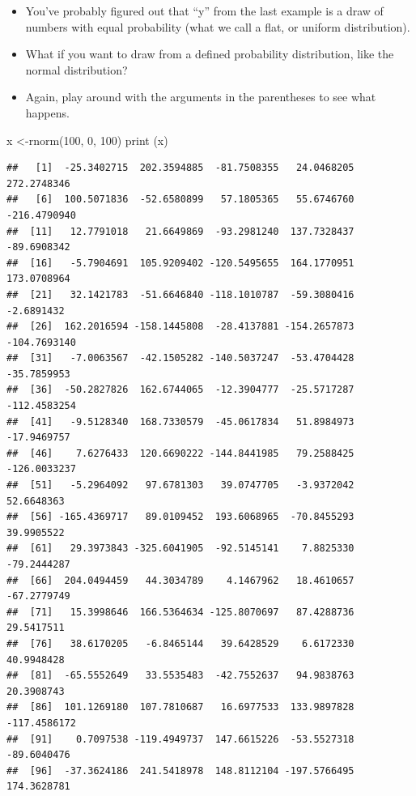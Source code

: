 \documentclass[
]{book}
\newenvironment{Shaded}{\begin{snugshade}}{\end{snugshade}}
\newcommand{\DecValTok}[1]{\textcolor[rgb]{0.00,0.00,0.81}{#1}}
\newcommand{\FunctionTok}[1]{\textcolor[rgb]{0.00,0.00,0.00}{#1}}
\newcommand{\NormalTok}[1]{#1}
\newcommand{\OtherTok}[1]{\textcolor[rgb]{0.56,0.35,0.01}{#1}}
\begin{document}
\begin{itemize}
\item
  You've probably figured out that ``y'' from the last example is a draw of numbers with equal probability (what we call a flat, or uniform distribution).
\item
  What if you want to draw from a defined probability distribution, like the normal distribution?
\item
  Again, play around with the arguments in the parentheses to see what happens.
\end{itemize}

\begin{Shaded}
\begin{Highlighting}[]
\NormalTok{x }\OtherTok{\textless{}{-}}\FunctionTok{rnorm}\NormalTok{(}\DecValTok{100}\NormalTok{, }\DecValTok{0}\NormalTok{, }\DecValTok{100}\NormalTok{)}
\FunctionTok{print}\NormalTok{ (x)}
\end{Highlighting}
\end{Shaded}

\begin{verbatim}
##   [1]  -25.3402715  202.3594885  -81.7508355   24.0468205  272.2748346
##   [6]  100.5071836  -52.6580899   57.1805365   55.6746760 -216.4790940
##  [11]   12.7791018   21.6649869  -93.2981240  137.7328437  -89.6908342
##  [16]   -5.7904691  105.9209402 -120.5495655  164.1770951  173.0708964
##  [21]   32.1421783  -51.6646840 -118.1010787  -59.3080416   -2.6891432
##  [26]  162.2016594 -158.1445808  -28.4137881 -154.2657873 -104.7693140
##  [31]   -7.0063567  -42.1505282 -140.5037247  -53.4704428  -35.7859953
##  [36]  -50.2827826  162.6744065  -12.3904777  -25.5717287 -112.4583254
##  [41]   -9.5128340  168.7330579  -45.0617834   51.8984973  -17.9469757
##  [46]    7.6276433  120.6690222 -144.8441985   79.2588425 -126.0033237
##  [51]   -5.2964092   97.6781303   39.0747705   -3.9372042   52.6648363
##  [56] -165.4369717   89.0109452  193.6068965  -70.8455293   39.9905522
##  [61]   29.3973843 -325.6041905  -92.5145141    7.8825330  -79.2444287
##  [66]  204.0494459   44.3034789    4.1467962   18.4610657  -67.2779749
##  [71]   15.3998646  166.5364634 -125.8070697   87.4288736   29.5417511
##  [76]   38.6170205   -6.8465144   39.6428529    6.6172330   40.9948428
##  [81]  -65.5552649   33.5535483  -42.7552637   94.9838763   20.3908743
##  [86]  101.1269180  107.7810687   16.6977533  133.9897828 -117.4586172
##  [91]    0.7097538 -119.4949737  147.6615226  -53.5527318  -89.6040476
##  [96]  -37.3624186  241.5418978  148.8112104 -197.5766495  174.3628781
\end{verbatim}
\end{document}

